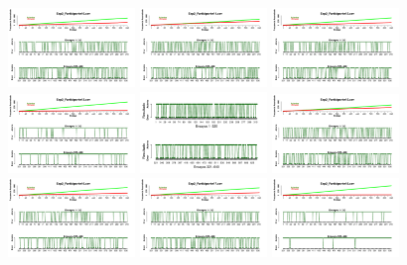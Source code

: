 \documentclass[a4paper ]{article}
\begin{document}
\begin{figure}[th]
\includegraphics[width=0.3\textwidth]{Figures/Success_Exp2_P10} \includegraphics[width=0.3\textwidth]{Figures/Success_Exp2_P11} \includegraphics[width=0.3\textwidth]{Figures/Success_Exp2_P12}
\includegraphics[width=0.3\textwidth]{Figures/Success_Exp2_P13} \includegraphics[width=0.3\textwidth]{Figures/Success_Exp2_P14} \includegraphics[width=0.3\textwidth]{Figures/Success_Exp2_P15}
\includegraphics[width=0.3\textwidth]{Figures/Success_Exp2_P16} \includegraphics[width=0.3\textwidth]{Figures/Success_Exp2_P17} \includegraphics[width=0.3\textwidth]{Figures/Success_Exp2_P18}

\end{figure}
\end{document}

